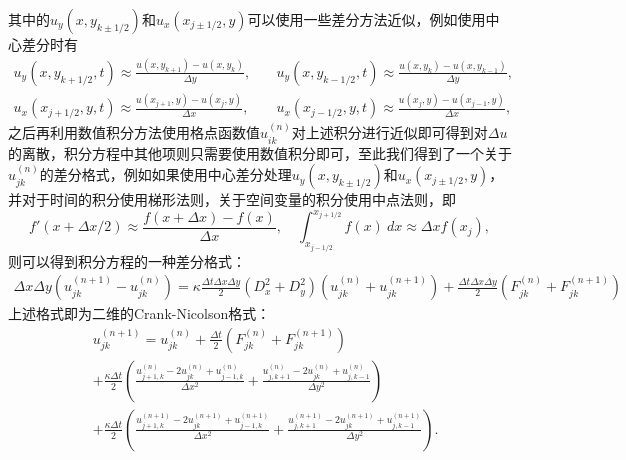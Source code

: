 \documentclass[a4paper,10pt]{ctexart}
\begin{document}
其中的$ u_y(x,y_{k\pm 1 / 2}) $和$ u_x(x_{j\pm 1 / 2},y) $可以使用一些差分方法近似，例如使用中心差分时有
\[
    \begin{aligned}
        u_y(x,y_{k+1 / 2},t) \approx \frac{u(x,y_{k+1})-u(x,y_k)}{\Delta y},\quad &
        u_y(x,y_{k-1 / 2},t) \approx \frac{u(x,y_k)-u(x,y_{k-1})}{\Delta y},\\
        u_x(x_{j+1 / 2},y,t) \approx \frac{u(x_{j+1},y)-u(x_j,y)}{\Delta x},\quad &
        u_x(x_{j-1 / 2},y,t) \approx \frac{u(x_j,y)-u(x_{j-1},y)}{\Delta x},
    \end{aligned}
\]
之后再利用数值积分方法使用格点函数值$ u^{(n)}_{ik} $对上述积分进行近似即可得到对$ \Delta u $的离散，积分方程中其他项则只需要使用数值积分即可，至此我们得到了一个关于$ u^{(n)}_{jk} $的差分格式，例如如果使用中心差分处理$ u_y(x,y_{k\pm 1 / 2}) $和$ u_x(x_{j\pm 1 / 2},y) $，并对于时间的积分使用梯形法则，关于空间变量的积分使用中点法则，即
\[
    f'(x+\Delta x / 2) \approx \frac{f(x+\Delta x)-f(x)}{\Delta x},\quad \int_{x_{j-1 / 2}}^{x_{j+1 / 2}} f(x)\ dx \approx \Delta x f(x_j),
\]
则可以得到积分方程的一种差分格式：
\begin{equation}
    \begin{aligned}
        \Delta x \Delta y(u^{(n+1)}_{jk} - u^{(n)}_{jk}) = \kappa \frac{\Delta t \Delta x \Delta y}{2}(D_x^2+D_y^2)(u^{(n)}_{jk}+u^{(n+1)}_{jk}) + \frac{\Delta t \Delta x \Delta y}{2}(F^{(n)}_{jk}+F^{(n+1)}_{jk})
    \end{aligned}
\end{equation}
上述格式即为二维的Crank-Nicolson格式：
\begin{equation}
    \begin{aligned}
        &u^{(n+1)}_{jk} = u^{(n)}_{jk} + \frac{\Delta t}{2}(F^{(n)}_{jk}+F^{(n+1)}_{jk})\\
        &+\frac{\kappa \Delta t}{2}\left( \frac{u^{(n)}_{j+1,k}-2u^{(n)}_{jk}+u^{(n)}_{j-1,k}}{\Delta x^2} + \frac{u^{(n)}_{j,k+1}-2u^{(n)}_{jk}+u^{(n)}_{j,k-1}}{\Delta y^2} \right)\\
        &+\frac{\kappa \Delta t}{2}\left(\frac{u^{(n+1)}_{j+1,k}-2u^{(n+1)}_{jk}+u^{(n+1)}_{j-1,k}}{\Delta x^2} + \frac{u^{(n+1)}_{j,k+1}-2u^{(n+1)}_{jk}+u^{(n+1)}_{j,k-1}}{\Delta y^2} \right).
    \end{aligned}
\end{equation}
\end{document}
